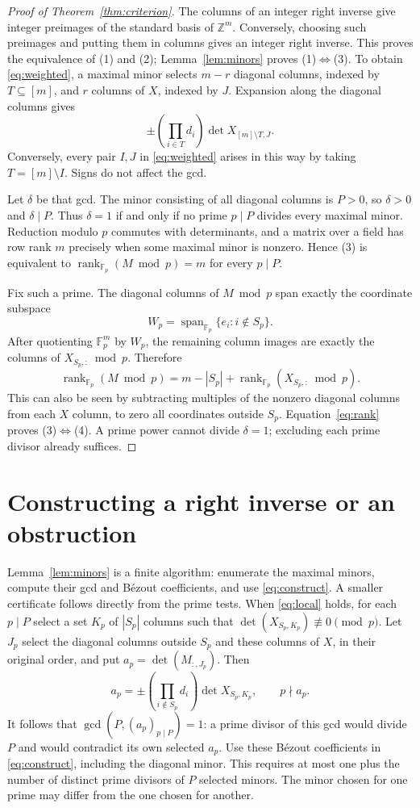 \documentclass[11pt]{article}
\DeclareMathOperator{\rank}{rank}
\newcommand{\Z}{\mathbb Z}
\newcommand{\F}{\mathbb F}
\begin{document}
\begin{proof}[Proof of Theorem~\ref{thm:criterion}]
The columns of an integer right inverse give integer preimages of the
standard basis of $\Z^m$. Conversely, choosing such preimages and
putting them in columns gives an integer right inverse. This proves
the equivalence of (1) and (2); Lemma~\ref{lem:minors} proves (1)$\iff$(3).
To obtain \eqref{eq:weighted}, a maximal minor selects $m-r$ diagonal
columns, indexed by $T\subseteq[m]$, and $r$ columns of $X$, indexed
by $J$. Expansion along the diagonal columns gives
\[
 \pm\left(\prod_{i\in T}d_i\right)\det X_{[m]\setminus T,J}.
\]
Conversely, every pair $I,J$ in \eqref{eq:weighted} arises in this way
by taking $T=[m]\setminus I$. Signs do not affect the gcd.

Let $\delta$ be that gcd. The minor consisting of all diagonal columns
is $P>0$, so $\delta>0$ and $\delta\mid P$. Thus $\delta=1$ if and
only if no prime $p\mid P$ divides every maximal minor. Reduction
modulo $p$ commutes with determinants, and a matrix over a field has
row rank $m$ precisely when some maximal minor is nonzero. Hence (3)
is equivalent to $\rank_{\F_p}(M\bmod p)=m$ for every $p\mid P$.

Fix such a prime. The diagonal columns of $M\bmod p$ span exactly
the coordinate subspace
\[
 W_p=\operatorname{span}_{\F_p}\{e_i:i\notin S_p\}.
\]
After quotienting $\F_p^m$ by $W_p$, the remaining column images are
exactly the columns of $X_{S_p,:}\bmod p$. Therefore
\begin{equation}\label{eq:rank}
 \rank_{\F_p}(M\bmod p)
   =m-|S_p|+\rank_{\F_p}(X_{S_p,:}\bmod p).
\end{equation}
This can also be seen by subtracting multiples of the nonzero
diagonal columns from each $X$ column, to zero all coordinates outside
$S_p$. Equation~\eqref{eq:rank} proves (3)$\iff$(4). A prime power
cannot divide $\delta=1$; excluding each prime divisor already suffices.
\end{proof}

\section{Constructing a right inverse or an obstruction}
Lemma~\ref{lem:minors} is a finite algorithm: enumerate the maximal
minors, compute their gcd and B\'ezout coefficients, and use
\eqref{eq:construct}. A smaller certificate follows directly from the
prime tests. When \eqref{eq:local} holds, for each $p\mid P$ select a
set $K_p$ of $|S_p|$ columns such that
$\det(X_{S_p,K_p})\not\equiv0\pmod p$. Let $J_p$ select the diagonal
columns outside $S_p$ and these columns of $X$, in their original
order, and put $a_p=\det(M_{:,J_p})$. Then
\[
 a_p=\pm\left(\prod_{i\notin S_p}d_i\right)\det X_{S_p,K_p},
 \qquad p\nmid a_p.
\]
It follows that $\gcd(P,(a_p)_{p\mid P})=1$: a prime divisor of this
gcd would divide $P$ and would contradict its own selected $a_p$.
Use these B\'ezout coefficients in \eqref{eq:construct}, including
the diagonal minor. This requires at most one plus the number of
distinct prime divisors of $P$ selected minors. The minor chosen for
one prime may differ from the one chosen for another.
\end{document}
